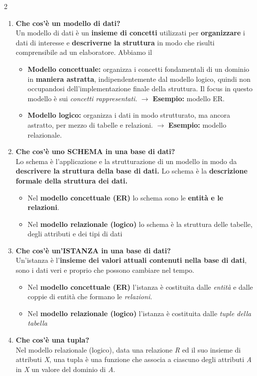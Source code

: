 \documentclass{article}
\newcommand{\sitemize}[1]{%
  \begin{itemize}[label=$\diamond$]
    #1
  \end{itemize}
}
\begin{document}
\begin{multicols}{2}
\begin{enumerate}[leftmargin=*, align=left]
		\item \textbf{Che cos'è un modello di dati?} \\
		Un modello di dati è un \textbf{insieme di concetti} utilizzati per \textbf{organizzare} i dati di interesse e \textbf{descriverne la struttura} in modo che risulti comprensibile ad un elaboratore. Abbiamo il \sitemize{\item \textbf{Modello concettuale:} organizza i concetti fondamentali di un dominio in \textbf{maniera astratta}, indipendentemente dal modello logico, quindi non occupandosi dell'implementazione finale della struttura. Il focus in questo modello è sui \textit{concetti rappresentati}. 
			$\rightarrow$ \textbf{Esempio:} modello ER.
			
			\item \textbf{Modello logico:} organizza i dati in modo strutturato, ma ancora astratto, per mezzo di tabelle e relazioni.
			$\rightarrow$ \textbf{Esempio:} modello relazionale. }
		
		\item \textbf{Che cos'è uno SCHEMA in una base di dati?} \\
		Lo schema è l'applicazione e la strutturazione di un modello in modo da \textbf{descrivere la struttura della base di dati.} Lo schema è la \textbf{descrizione formale della struttura dei dati.} \sitemize{\item Nel \textbf{modello concettuale (ER)} lo schema sono le \textbf{entità e le relazioni}. \item Nel \textbf{modello relazionale (logico)} lo schema è la struttura delle tabelle, degli attributi e dei tipi di dati}
		
		\item \textbf{Che cos'è un'ISTANZA in una base di dati?} \\
		Un'istanza è l'\textbf{insieme dei valori attuali contenuti nella base di dati}, sono i dati veri e proprio che possono cambiare nel tempo. \sitemize{\item Nel \textbf{modello concettuale (ER)} l'istanza è costituita dalle \textit{entità} e dalle coppie di entità che formano le \textit{relazioni}. \item Nel \textbf{modello relazionale (logico)} l'istanza è costituita dalle \textit{tuple della tabella}}
		
		\item \textbf{Che cos'è una tupla?}\\
		Nel modello relazionale (logico), data una relazione \textit{R }ed il suo insieme di attributi \textit{X}, una tupla è una funzione che associa a ciascuno degli attributi \textit{A} in \textit{X} un valore del dominio di \textit{A}.
		

\end{enumerate}
\end{multicols}
\end{document}
